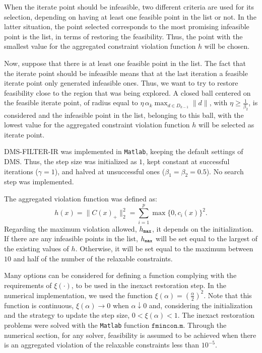 \documentclass[12pt]{article}
\newcommand{\set}[1]{\{#1\}}
\begin{document}
When the iterate point should be infeasible, two different
criteria are used for its selection, depending on having at least
one feasible point in the list or not. In the latter situation,
the point selected corresponds to the most promising infeasible
point is the list, in terms of restoring the feasibility. Thus,
the point with the smallest value for the aggregated constraint
violation function $h$ will be chosen.

Now, suppose that there is at least one feasible point in the
list. The fact that the iterate point should be infeasible means
that at the last iteration a feasible iterate point only generated
infeasible ones. Thus, we want to try to restore feasibility close
to the region that was being explored. A closed ball centered on
the feasible iterate point, of radius equal to $\eta\,\alpha_k
\max_{d\in D_{k-1}}\|d\|$, with $\eta\geq \frac{1}{\beta_2}$, is
considered and the infeasible point in the list, belonging to this
ball, with the lowest value for the aggregated constraint
violation function $h$ will be selected as iterate point.

DMS-FILTER-IR was implemented in \texttt{Matlab}, keeping the
default settings of DMS. Thus, the step size was initialized as
$1$, kept constant at successful iterations ($\gamma = 1$), and
halved at unsuccessful ones ($\beta_1=\beta_2 = 0.5$). No search
step was implemented.

The aggregated violation function was defined as:
\begin{equation*}
h(x)=\|C(x)_+\|_2^2=\displaystyle\sum_{i=1}^{p}\max\set{0,c_i(x)}^2.
\end{equation*} Regarding the maximum violation allowed, $h_{\tt max}$, it
depends on the initialization. If there are any infeasible points
in the list, $h_{\tt max}$ will be set equal to the largest of the
existing values of $h$. Otherwise, it will be set equal to the
maximum between $10$ and half of the number of the relaxable
constraints.

Many options can be considered for defining a function complying
with the requirements of $\xi(\cdot)$, to be used in the inexact
restoration step. In the numerical implementation, we used the
function $\xi(\alpha)=(\frac{\alpha}{2})^2$. Note that this
function is continuous, $\xi(\alpha)\to 0$ when $\alpha\downarrow
0$ and, considering the initialization and the strategy to update
the step size, $0<\xi(\alpha)<1$. The inexact restoration problems
were solved with the \texttt{Matlab} function
$\texttt{fmincon.m}$. Through the numerical section, for any
solver, feasibility is assumed to be achieved when there is an
aggregated violation of the relaxable constraints less than
$10^{-5}$.
\end{document}
